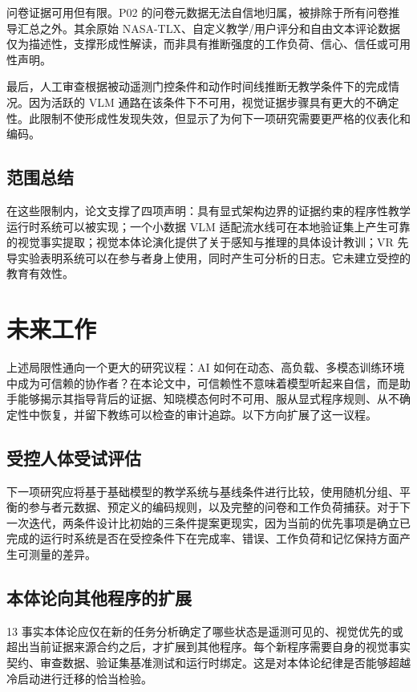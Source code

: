 问卷证据可用但有限。P02 的问卷元数据无法自信地归属，被排除于所有问卷推导汇总之外。其余原始 NASA-TLX、自定义教学/用户评分和自由文本评论数据仅为描述性，支撑形成性解读，而非具有推断强度的工作负荷、信心、信任或可用性声明。

最后，人工审查根据被动遥测门控条件和动作时间线推断无教学条件下的完成情况。因为活跃的 VLM 通路在该条件下不可用，视觉证据步骤具有更大的不确定性。此限制不使形成性发现失效，但显示了为何下一项研究需要更严格的仪表化和编码。

\subsection{范围总结}

在这些限制内，论文支撑了四项声明：具有显式架构边界的证据约束的程序性教学运行时系统可以被实现；一个小数据 VLM 适配流水线可在本地验证集上产生可靠的视觉事实提取；视觉本体论演化提供了关于感知与推理的具体设计教训；VR 先导实验表明系统可以在参与者身上使用，同时产生可分析的日志。它未建立受控的教育有效性。

\section{未来工作}\label{sec:disc-future}

上述局限性通向一个更大的研究议程：AI 如何在动态、高负载、多模态训练环境中成为可信赖的协作者？在本论文中，可信赖性不意味着模型听起来自信，而是助手能够揭示其指导背后的证据、知晓模态何时不可用、服从显式程序规则、从不确定性中恢复，并留下教练可以检查的审计追踪。以下方向扩展了这一议程。

\subsection{受控人体受试评估}

下一项研究应将基于基础模型的教学系统与基线条件进行比较，使用随机分组、平衡的参与者元数据、预定义的编码规则，以及完整的问卷和工作负荷捕获。对于下一次迭代，两条件设计比初始的三条件提案更现实，因为当前的优先事项是确立已完成的运行时系统是否在受控条件下在完成率、错误、工作负荷和记忆保持方面产生可测量的差异。

\subsection{本体论向其他程序的扩展}

13 事实本体论应仅在新的任务分析确定了哪些状态是遥测可见的、视觉优先的或超出当前证据来源合约之后，才扩展到其他程序。每个新程序需要自身的视觉事实契约、审查数据、验证集基准测试和运行时绑定。这是对本体论纪律是否能够超越冷启动进行迁移的恰当检验。

